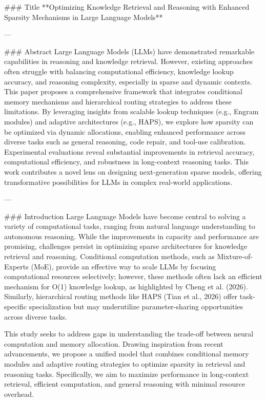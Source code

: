 ### Title  
**Optimizing Knowledge Retrieval and Reasoning with Enhanced Sparsity Mechanisms in Large Language Models**

---

### Abstract  
Large Language Models (LLMs) have demonstrated remarkable capabilities in reasoning and knowledge retrieval. However, existing approaches often struggle with balancing computational efficiency, knowledge lookup accuracy, and reasoning complexity, especially in sparse and dynamic contexts. This paper proposes a comprehensive framework that integrates conditional memory mechanisms and hierarchical routing strategies to address these limitations. By leveraging insights from scalable lookup techniques (e.g., Engram modules) and adaptive architectures (e.g., HAPS), we explore how sparsity can be optimized via dynamic allocations, enabling enhanced performance across diverse tasks such as general reasoning, code repair, and tool-use calibration. Experimental evaluations reveal substantial improvements in retrieval accuracy, computational efficiency, and robustness in long-context reasoning tasks. This work contributes a novel lens on designing next-generation sparse models, offering transformative possibilities for LLMs in complex real-world applications.

---

### Introduction  
Large Language Models have become central to solving a variety of computational tasks, ranging from natural language understanding to autonomous reasoning. While the improvements in capacity and performance are promising, challenges persist in optimizing sparse architectures for knowledge retrieval and reasoning. Conditional computation methods, such as Mixture-of-Experts (MoE), provide an effective way to scale LLMs by focusing computational resources selectively; however, these methods often lack an efficient mechanism for O(1) knowledge lookup, as highlighted by Cheng et al. (2026). Similarly, hierarchical routing methods like HAPS (Tian et al., 2026) offer task-specific specialization but may underutilize parameter-sharing opportunities across diverse tasks.

This study seeks to address gaps in understanding the trade-off between neural computation and memory allocation. Drawing inspiration from recent advancements, we propose a unified model that combines conditional memory modules and adaptive routing strategies to optimize sparsity in retrieval and reasoning tasks. Specifically, we aim to maximize performance in long-context retrieval, efficient computation, and general reasoning with minimal resource overhead.

